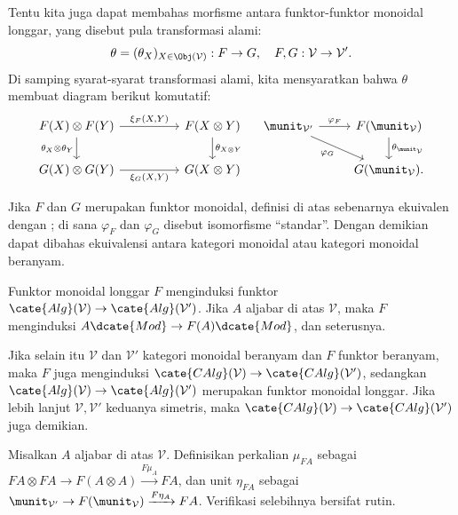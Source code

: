 Tentu kita juga dapat membahas morfisme antara funktor-funktor monoidal
longgar, yang disebut pula transformasi alami:
\[ \theta = (\theta_X)_{X \in \Obj(\mathcal{V})}: F \to G, \quad F, G: \mathcal{V} \to \mathcal{V}' . \]
Di samping syarat-syarat transformasi alami, kita mensyaratkan bahwa $\theta$
membuat diagram berikut komutatif:
\[\begin{tikzcd}[column sep=huge]
	F(X) \otimes F(Y) \arrow[r, "{\xi_F(X, Y)}"] \arrow[d, "{\theta_X \otimes \theta_Y}"'] & F(X \otimes Y) \arrow[d, "{\theta_{X \otimes Y}}"] \\
	G(X) \otimes G(Y) \arrow[r, "{\xi_G(X, Y)}"'] & G(X \otimes Y)
\end{tikzcd} \quad \begin{tikzcd}
	\munit_{\mathcal{V}'} \arrow[r, "{\varphi_F}"] \arrow[rd, "{\varphi_G}"'] & F(\munit_{\mathcal{V}}) \arrow[d, "{\theta_{\munit_{\mathcal{V}}}}"] \\
	& G(\munit_{\mathcal{V}}) .
\end{tikzcd}\]

Jika $F$ dan $G$ merupakan funktor monoidal, definisi di atas sebenarnya
ekuivalen dengan \cite[Definisi 3.1.10]{Li1}; di sana $\varphi_F$ dan
$\varphi_G$ disebut isomorfisme ``standar''. Dengan demikian dapat dibahas
ekuivalensi antara kategori monoidal atau kategori monoidal beranyam.

\begin{proposisi}\label{prop:lax-monoidal-Alg}
	Funktor monoidal longgar $F$ menginduksi funktor
	$\cate{Alg}(\mathcal{V})\to\cate{Alg}(\mathcal{V}')$. Jika $A$ aljabar di
	atas $\mathcal{V}$, maka $F$ menginduksi
	$A\dcate{Mod}\to F(A)\dcate{Mod}$, dan seterusnya.

	Jika selain itu $\mathcal{V}$ dan $\mathcal{V}'$ kategori monoidal beranyam
	dan $F$ funktor beranyam, maka $F$ juga menginduksi
	$\cate{CAlg}(\mathcal{V})\to\cate{CAlg}(\mathcal{V}')$, sedangkan
	$\cate{Alg}(\mathcal{V})\to\cate{Alg}(\mathcal{V}')$ merupakan funktor
	monoidal longgar. Jika lebih lanjut $\mathcal{V},\mathcal{V}'$ keduanya
	simetris, maka $\cate{CAlg}(\mathcal{V})\to\cate{CAlg}(\mathcal{V}')$ juga
	demikian.
\end{proposisi}
\begin{bukti}
	Misalkan $A$ aljabar di atas $\mathcal{V}$. Definisikan perkalian
	$\mu_{FA}$ sebagai
	$FA\otimes FA\to F(A\otimes A)\xrightarrow{F\mu_A}FA$, dan unit $\eta_{FA}$
	sebagai
	$\munit_{\mathcal{V}'}\to F(\munit_{\mathcal{V}})\xrightarrow{F\eta_A}FA$.
	Verifikasi selebihnya bersifat rutin.
\end{bukti}

